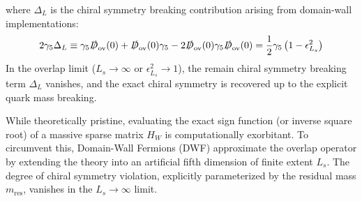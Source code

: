 where $\Delta_L$ is the chiral symmetry breaking contribution arising from domain-wall implementations:
\begin{equation}
2\gamma_5\Delta_L \equiv \gamma_5 \slashed{D}_{\mathrm{ov}}(0) + \slashed{D}_{\mathrm{ov}}(0)\gamma_5 - 2\slashed{D}_{\mathrm{ov}}(0)\gamma_5 \slashed{D}_{\mathrm{ov}}(0) = \frac{1}{2}\gamma_5\left(1 - \epsilon_{L_s}^2\right)
\label{eq:overlap_anomaly_Ls}
\end{equation}
In the overlap limit ($L_s \to \infty$ or $\epsilon_{L_s}^2 \to 1$), the remain chiral symmetry breaking  term $\Delta_L$ vanishes, and the exact chiral symmetry is recovered up to the explicit quark mass breaking.

While theoretically pristine, evaluating the exact sign function (or inverse square root) of a massive sparse matrix $H_W$ is computationally exorbitant. To circumvent this, Domain-Wall Fermions (DWF) approximate the overlap operator by extending the theory into an artificial fifth dimension of finite extent $L_s$. The degree of chiral symmetry violation, explicitly parameterized by the residual mass $m_{\mathrm{res}}$, vanishes in the $L_s \to \infty$ limit.

